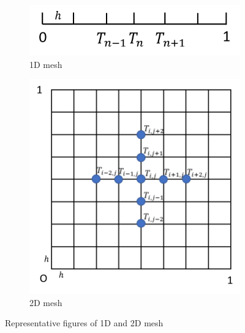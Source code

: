 \documentclass{article}
\begin{document}
\begin{figure}
    \centering
    \begin{subfigure}[t]{.5\textwidth}
        \centering
        \includegraphics[width=0.9\linewidth]{1d_mesh.png}
        \caption{1D mesh}
    \label{fig:mesh1d}
    \end{subfigure}%
    \begin{subfigure}[t]{.5\textwidth}
        \centering
        \includegraphics[width=0.9\linewidth]{2d_mesh.png}
        \caption{2D mesh}
    \label{fig:mesh2d}
    \end{subfigure}
    \caption{Representative figures of 1D and 2D mesh}
\label{fig:mesh}
\end{figure}

\end{document}
